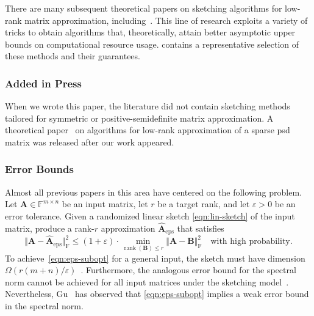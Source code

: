 \documentclass[final]{siamart1116}
\numberwithin{equation}{section}
\numberwithin{theorem}{section}
\numberwithin{figure}{section}
\newcommand{\F}{\mathbb{F}}
\newcommand{\eps}{\varepsilon}
\newcommand{\mtx}[1]{\bm{#1}}
\newcommand{\rank}{\operatorname{rank}}
\newcommand{\norm}[1]{\Vert #1 \Vert}
\newcommand{\fnorm}[1]{\norm{#1}_{\mathrm{F}}}
\newcommand{\fnormsq}[1]{\fnorm{#1}^2}
\begin{document}
There are many subsequent theoretical papers on
sketching algorithms for low-rank matrix approximation,
including~\cite{Woo14:Sketching-Tool,CEM+15:Dimensionality-Reduction,
BWZ16:Optimal-Principal-STOC}.  This line of research exploits a variety
of tricks to obtain algorithms that, theoretically,
attain better asymptotic upper bounds on computational resource usage.
 contains a representative selection
of these methods and their guarantees.

\subsubsection{Added in Press}

When we wrote this paper, the literature did not contain
sketching methods tailored for symmetric or positive-semidefinite
matrix approximation.
A theoretical paper~\cite{CW17:Low-Rank-PSD}
on algorithms for low-rank approximation
of a sparse psd matrix was released after our work appeared.









\subsubsection{Error Bounds}

Almost all previous papers in this area have centered on the
following problem.
Let $\mtx{A} \in \F^{m \times n}$ be an input matrix,
let $r$ be a target rank,  and let $\eps > 0$ be an error tolerance.
Given a randomized linear sketch \cref{eqn:lin-sketch} of the input matrix,
produce a rank-$r$ approximation $\hat{\mtx{A}}_{\mathrm{eps}}$ that satisfies
\begin{equation} \label{eqn:eps-subopt}
\fnormsq{\mtx{A} - \hat{\mtx{A}}_{\mathrm{eps}}}
	\leq (1 + \eps) \cdot \min_{\rank( \mtx{B} ) \leq r} \fnormsq{ \mtx{A} - \mtx{B} }
	\quad\text{with high probability}.
\end{equation}
To achieve~\cref{eqn:eps-subopt} for a general input,
the sketch must have dimension $\Omega(r(m+n)/\eps)$~\cite[Thm.~4.10]{CW09:Numerical-Linear}.
Furthermore, the analogous error bound for the spectral norm cannot be achieved
for all input matrices under the sketching model~\cite[Ch.~6.2]{Woo14:Sketching-Tool}.
Nevertheless, Gu~\cite[Thm.~3.4]{Gu15:Subspace-Iteration}
has observed that \cref{eqn:eps-subopt} implies a
weak error bound in the spectral norm.
\end{document}
